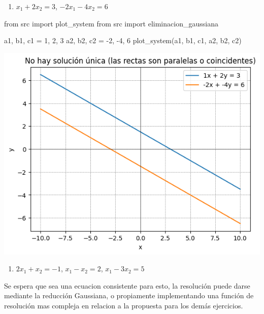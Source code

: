 \documentclass[
  letterpaper,
  DIV=11,
  numbers=noendperiod]{scrartcl}
\newenvironment{Shaded}{\begin{snugshade}}{\end{snugshade}}
\newcommand{\DecValTok}[1]{\textcolor[rgb]{0.68,0.00,0.00}{#1}}
\newcommand{\ImportTok}[1]{\textcolor[rgb]{0.00,0.46,0.62}{#1}}
\newcommand{\NormalTok}[1]{\textcolor[rgb]{0.00,0.23,0.31}{#1}}
\newcommand{\OperatorTok}[1]{\textcolor[rgb]{0.37,0.37,0.37}{#1}}
\providecommand{\tightlist}{%
  \setlength{\itemsep}{0pt}\setlength{\parskip}{0pt}}\usepackage{longtable,booktabs,array}
\begin{document}
\begin{enumerate}
\def\labelenumi{\alph{enumi}.}
\setcounter{enumi}{1}
\tightlist
\item
  \(x_1 + 2x_2 = 3\), \(-2x_1 - 4x_2 = 6\)
\end{enumerate}

\begin{Shaded}
\begin{Highlighting}[]
\ImportTok{from}\NormalTok{ src }\ImportTok{import}\NormalTok{ plot\_system}
\ImportTok{from}\NormalTok{ src }\ImportTok{import}\NormalTok{ eliminacion\_gaussiana}

\NormalTok{a1, b1, c1 }\OperatorTok{=} \DecValTok{1}\NormalTok{, }\DecValTok{2}\NormalTok{, }\DecValTok{3}
\NormalTok{a2, b2, c2 }\OperatorTok{=} \OperatorTok{{-}}\DecValTok{2}\NormalTok{, }\OperatorTok{{-}}\DecValTok{4}\NormalTok{, }\DecValTok{6}
\NormalTok{plot\_system(a1, b1, c1, a2, b2, c2)}
\end{Highlighting}
\end{Shaded}

\includegraphics{tarea9_files/figure-pdf/cell-3-output-1.png}

\begin{enumerate}
\def\labelenumi{\alph{enumi}.}
\setcounter{enumi}{2}
\tightlist
\item
  \(2x_1 + x_2 = -1\), \(x_1 - x_2 = 2\), \(x_1-3x_2=5\)
\end{enumerate}

Se espera que sea una ecuacion consistente para esto, la resolución
puede darse mediante la reducción Gaussiana, o propiamente implementando
una función de resolución mas compleja en relacion a la propuesta para
los demás ejercicios.
\end{document}
